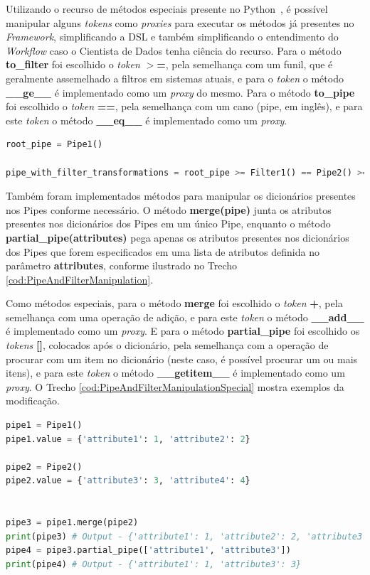 \documentclass[portugues]{ic-tese}
\begin{document}
Utilizando o recurso de métodos especiais presente no Python~\citep{Pyspmethods_2022}, é possível manipular alguns \textit{tokens} como \textit{proxies} para executar os métodos já presentes no \textit{Framework}, simplificando a DSL e também simplificando o entendimento do \textit{Workflow} caso o Cientista de Dados tenha ciência do recurso. Para o método \textbf{to\_filter} foi escolhido o \textit{token} \textbf{$>$=}, pela semelhança com um funil, que é geralmente assemelhado a filtros em sistemas atuais, e para o \textit{token} o método \textbf{\_\_ge\_\_} é implementado como um \textit{proxy} do mesmo. Para o método \textbf{to\_pipe} foi escolhido o \textit{token} \textbf{==}, pela semelhança com um cano (pipe, em inglês), e para este \textit{token} o método \textbf{\_\_eq\_\_} é implementado como um \textit{proxy}.

\begin{lstlisting}[language=Python, caption=Trecho \ref{cod:PipeAndFilterMethods} adaptado com métodos especiais da linguagem \textit{Python},label=cod:PipeAndFilterSpecialMethods]
root_pipe = Pipe1()

pipe_with_filter_transformations = root_pipe >= Filter1() == Pipe2() >= Filter2() == Pipe3()
\end{lstlisting}

Também foram implementados métodos para manipular os dicionários presentes nos Pipes conforme necessário. O método \textbf{merge(pipe)} junta os atributos presentes nos dicionários dos Pipes em um único Pipe, enquanto o método \textbf{partial\_pipe(attributes)} pega apenas os atributos presentes nos dicionários dos Pipes que forem especificados em uma lista de atributos definida no parâmetro \textbf{attributes}, conforme ilustrado no Trecho \ref{cod:PipeAndFilterManipulation}.

Como métodos especiais, para o método \textbf{merge} foi escolhido o \textit{token} \textbf{+}, pela semelhança com uma operação de adição, e para este \textit{token} o método \textbf{\_\_add\_\_} é implementado como um \textit{proxy}. E para o método \textbf{partial\_pipe} foi escolhido os \textit{tokens} \textbf{[]}, colocados após o dicionário, pela semelhança com a operação de procurar com um item no dicionário (neste caso, é possível procurar um ou mais itens), e para este \textit{token} o método \textbf{\_\_getitem\_\_} é implementado como um \textit{proxy}. O Trecho \ref{cod:PipeAndFilterManipulationSpecial} mostra exemplos da modificação.

\begin{lstlisting}[language=Python, caption=Manipulações para Pipes presentes no \textit{Framework},label=cod:PipeAndFilterManipulation]
pipe1 = Pipe1()
pipe1.value = {'attribute1': 1, 'attribute2': 2}

pipe2 = Pipe2()
pipe2.value = {'attribute3': 3, 'attribute4': 4}


pipe3 = pipe1.merge(pipe2)
print(pipe3) # Output - {'attribute1': 1, 'attribute2': 2, 'attribute3': 3, 'attribute4': 4}
pipe4 = pipe3.partial_pipe(['attribute1', 'attribute3'])
print(pipe4) # Output - {'attribute1': 1, 'attribute3': 3}
\end{lstlisting}
\end{document}
